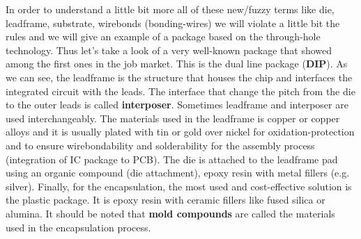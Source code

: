 \documentclass[final]{cubedoc}
\begin{document}
	In order to understand a little bit more all of these new/fuzzy terms like die, leadframe, substrate, wirebonds (bonding-wires) we will violate a little bit the rules and we will give an example of a package based on the through-hole technology. Thus let's take a look of a very well-known package that showed among the first ones in the job market. This is the dual line package (\textbf{DIP}). As we can see, the leadframe is the structure that houses the chip and interfaces the integrated circuit with the leads. The interface that change the pitch from the die to the outer leads is called \textbf{interposer}. Sometimes leadframe and interposer are used interchangeably. The materials used in the leadframe is copper or copper alloys and it is usually plated with tin or gold over nickel for oxidation-protection and to ensure wirebondability and solderability for the assembly process (integration of IC package to PCB). The die is attached to the leadframe pad using an organic compound (die attachment), epoxy resin with metal fillers (e.g. silver). Finally, for the encapsulation, the most used and cost-effective solution is the plastic package. It is epoxy resin with ceramic fillers like fused silica or alumina. It should be noted that \textbf{mold compounds} are called the materials used in the encapsulation process. 
	
	
\end{document}
